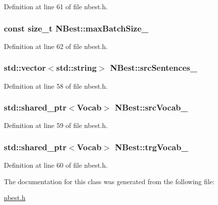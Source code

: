 Definition at line 61 of file nbest.\+h.

\subsubsection[{\texorpdfstring{max\+Batch\+Size\+\_\+}{maxBatchSize_}}]{\setlength{\rightskip}{0pt plus 5cm}const size\+\_\+t N\+Best\+::max\+Batch\+Size\+\_\+\hspace{0.3cm}{\ttfamily [private]}}\hypertarget{classNBest_ab2110b8e8664578b3b4c4857c9a58cca}{}\label{classNBest_ab2110b8e8664578b3b4c4857c9a58cca}


Definition at line 62 of file nbest.\+h.

\subsubsection[{\texorpdfstring{src\+Sentences\+\_\+}{srcSentences_}}]{\setlength{\rightskip}{0pt plus 5cm}std\+::vector$<$std\+::string$>$ N\+Best\+::src\+Sentences\+\_\+\hspace{0.3cm}{\ttfamily [private]}}\hypertarget{classNBest_a40c6af9a533bd2a7bb440d0aae299021}{}\label{classNBest_a40c6af9a533bd2a7bb440d0aae299021}


Definition at line 58 of file nbest.\+h.

\subsubsection[{\texorpdfstring{src\+Vocab\+\_\+}{srcVocab_}}]{\setlength{\rightskip}{0pt plus 5cm}std\+::shared\+\_\+ptr$<$Vocab$>$ N\+Best\+::src\+Vocab\+\_\+\hspace{0.3cm}{\ttfamily [private]}}\hypertarget{classNBest_a224740f4ca49e8e7afedac7bef6e4e1e}{}\label{classNBest_a224740f4ca49e8e7afedac7bef6e4e1e}


Definition at line 59 of file nbest.\+h.

\subsubsection[{\texorpdfstring{trg\+Vocab\+\_\+}{trgVocab_}}]{\setlength{\rightskip}{0pt plus 5cm}std\+::shared\+\_\+ptr$<$Vocab$>$ N\+Best\+::trg\+Vocab\+\_\+\hspace{0.3cm}{\ttfamily [private]}}\hypertarget{classNBest_acdbc9f2515ebc4c7b05b4955895e1392}{}\label{classNBest_acdbc9f2515ebc4c7b05b4955895e1392}


Definition at line 60 of file nbest.\+h.



The documentation for this class was generated from the following file\+:\begin{DoxyCompactItemize}
\item 
\hyperlink{nbest_8h}{nbest.\+h}\end{DoxyCompactItemize}
